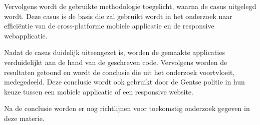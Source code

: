 Vervolgens wordt de gebruikte methodologie toegelicht, waarna de casus uitgelegd wordt.
Deze casus is de basis die zal gebruikt wordt in het onderzoek naar efficiëntie van de
cross-platforme mobiele applicatie en de responsive webapplicatie.

Nadat de casus duidelijk uiteengezet is, worden de gemaakte applicaties verduidelijkt aan de hand van de geschreven code.
Vervolgens worden de resultaten getoond en wordt de conclusie die uit het onderzoek voortvloeit, medegedeeld.
Deze conclusie wordt ook gebruikt door de Gentse politie in hun keuze tussen een mobiele applicatie of een responsive website.

Na de conclusie worden er nog richtlijnen voor toekomstig onderzoek gegeven in deze materie.

